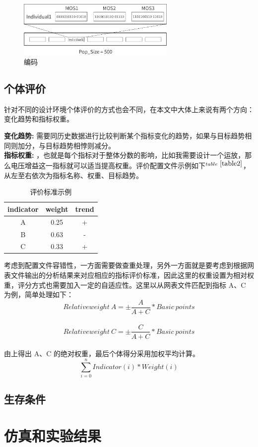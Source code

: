 \documentclass[14pt, a4paper]{article}
\begin{document}
        \begin{figure}[htbp]
            \centering
            \includegraphics[width= 3in]{fig/encoding_black.png}
            \caption{编码}
            \label{fig3}
        \end{figure}
    \subsection{个体评价}
        针对不同的设计环境个体评价的方式也会不同，在本文中大体上来说有两个方向：变化趋势和指标权重。
        
        \textbf{变化趋势: }需要同历史数据进行比较判断某个指标变化的趋势，如果与目标趋势相同则加分，与目标趋势相悖则减分。 \\
        
        \textbf{指标权重: }，也就是每个指标对于整体分数的影响，比如我需要设计一个运放，那么电压增益这一指标就可以适当提高权重。评价配置文件示例如下$^{table\ \ref{table2}}$，从左至右依次为指标名称、权重、目标趋势。
        
        \begin{table}[htbp]
            \centering
            \begin{tabular}{ccc}
                \toprule
                indicator & weight & trend \\
                \midrule
                A & 0.25 & + \\
                B & 0.63 & - \\
                C & 0.33 & + \\
                \bottomrule
            \end{tabular}
            \caption{评价标准示例}
            \label{table2}
        \end{table}
    
        考虑到配置文件容错性，一方面需要做查重处理，另外一方面就是要考虑到根据网表文件输出的分析结果来对应相应的指标评价标准，因此这里的权重设置为相对权重，评分方式也需要加入一定的自适应性。这里以从网表文件匹配到指标 A、C 为例，简单处理如下：\\
        $$Relative weight\ A = \pm \frac{A}{A+C}*Basic\ points$$ \\
        $$Relative weight\ C = \pm \frac{C}{A+C}*Basic\ points$$ \\
        由上得出 A、C 的绝对权重，最后个体得分采用加权平均计算。 \\
        $$\sum_{i=0}^{n} Indicator(i) * Weight(i)$$ 
        
    \subsection{生存条件}
        
\section{仿真和实验结果}
\end{document}
